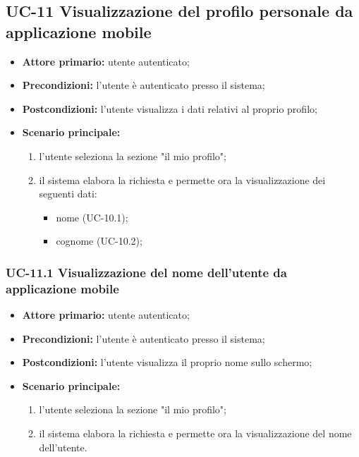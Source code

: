 \subsection{UC-11 Visualizzazione del profilo personale da applicazione mobile}
\begin{itemize}
	\item \textbf{Attore primario:} utente autenticato;

	\item \textbf{Precondizioni:} l'utente è autenticato presso il sistema;

	\item \textbf{Postcondizioni:} l'utente visualizza i dati relativi al proprio profilo;

	\item \textbf{Scenario principale:}
		\begin{enumerate}
   			 \item  l'utente seleziona la sezione "il mio profilo";
    		 \item  il sistema elabora la richiesta e permette ora la visualizzazione dei seguenti dati:
   			\begin{itemize}
     			\item nome (UC-10.1);
         	    \item cognome (UC-10.2);
   			\end{itemize}
	   	\end{enumerate}
\end{itemize}


\subsubsection{UC-11.1 Visualizzazione del nome dell'utente da applicazione mobile}
\begin{itemize}
	\item \textbf{Attore primario:} utente autenticato;

	\item \textbf{Precondizioni:} l'utente è autenticato presso il sistema;

	\item \textbf{Postcondizioni:} l'utente visualizza il proprio nome sullo schermo;

	\item \textbf{Scenario principale:}
		\begin{enumerate}
    		\item  l'utente seleziona la sezione "il mio profilo";
    		\item  il sistema elabora la richiesta e permette ora la visualizzazione del nome dell'utente.
		\end{enumerate}
\end{itemize}

